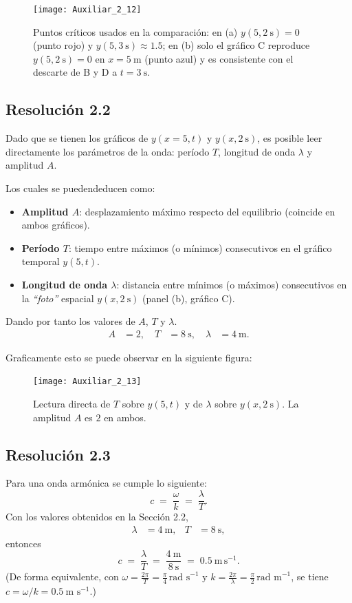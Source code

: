 \documentclass[
  11pt,
  letterpaper,
   addpoints,
  ]{exam}
\begin{document}
\begin{questions}
\begin{solution}
\begin{figure}[H]
  \centering
  \texttt{[image: Auxiliar\_2\_12]}
  \caption{Puntos críticos usados en la comparación: en (a) $y(5,2~\text{s})=0$ (punto rojo) y $y(5,3~\text{s})\approx 1.5$; en (b) solo el gráfico C reproduce $y(5,2~\text{s})=0$ en $x=5~\text{m}$ (punto azul) y es consistente con el descarte de B y D a $t=3~\text{s}$.}
\end{figure}
\subsection*{Resolución 2.2}
Dado que se tienen los gráficos de \(y(x=5,t)\) y \(y(x,2~\text{s})\), es posible leer directamente los parámetros de la onda: período \(T\), longitud de onda \(\lambda\) y amplitud \(A\).

Los cuales se puedendeducen como:
\begin{itemize}
  \item \textbf{Amplitud \(A\)}: desplazamiento máximo respecto del equilibrio (coincide en ambos gráficos).
  \item \textbf{Período \(T\)}: tiempo entre máximos (o mínimos) consecutivos en el gráfico temporal \(y(5,t)\).
  \item \textbf{Longitud de onda \(\lambda\)}: distancia entre mínimos (o máximos) consecutivos en la \emph{“foto”} espacial \(y(x,2~\text{s})\) (panel (b), gráfico C).
\end{itemize}
Dando por tanto los valores de \(A\), \(T\) y \(\lambda\).
\begin{align}
A &= 2, \quad T &= 8~\text{s}, \quad \lambda &= 4~\text{m}.
\end{align}

Graficamente esto se puede observar en la siguiente figura:
\begin{figure}[H]
  \centering
  \texttt{[image: Auxiliar\_2\_13]}
  \caption{Lectura directa de \(T\) sobre \(y(5,t)\) y de \(\lambda\) sobre \(y(x,2~\text{s})\).
  La amplitud \(A\) es \(2\) en ambos.}
\end{figure}
\subsection*{Resolución 2.3}

Para una onda armónica se cumple lo siguiente:
\begin{equation}
c \;=\; \frac{\omega}{k} \;=\; \frac{\lambda}{T}.
\end{equation}
Con los valores obtenidos en la Sección 2.2,
\begin{align}
\lambda &= 4~\text{m}, &
T &= 8~\text{s},
\end{align}
entonces
\begin{equation}
c \;=\; \frac{\lambda}{T} \;=\; \frac{4~\text{m}}{8~\text{s}}
\;=\; 0.5~\text{m}\,\text{s}^{-1}.
\end{equation}
(De forma equivalente, con \(\omega=\tfrac{2\pi}{T}=\tfrac{\pi}{4}\,\text{rad s}^{-1}\) y
\(k=\tfrac{2\pi}{\lambda}=\tfrac{\pi}{2}\,\text{rad m}^{-1}\),
se tiene \(c=\omega/k=0.5~\text{m s}^{-1}\).)


\end{solution}
\end{questions}
\end{document}
